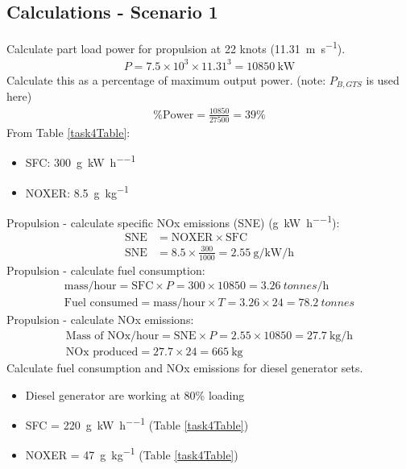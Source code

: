 \subsection{Calculations - Scenario 1}
Calculate part load power for propulsion at 22 knots (\SI{11.31}{\meter\per\second}).
\begin{gather}
    P = 7.5 \times 10^3 \times 11.31^3 = \SI{10850}{\kilo\watt}
\end{gather}
Calculate this as a percentage of maximum output power. (note: $P_{B,GTS}$ is used here)
\begin{gather}
    \textrm{\% Power} = \frac{10850}{27500} = 39\%
\end{gather}
From Table \ref{task4Table}:
\begin{itemize}
    \item SFC: \SI{300}{\gram\per\kilo\watt\per\hour}
    \item NOXER: \SI{8.5}{\gram\per\kilo\gram}
\end{itemize}
Propulsion - calculate specific NOx emissions (SNE) (\si{\gram\per\kilo\watt\per\hour}):
\begin{align}
    \textrm{SNE} & = \textrm{NOXER} \times \textrm{SFC}                                   \\
    \textrm{SNE} & = 8.5\times \frac{300}{1000} = \SI{2.55}{\gram\per\kilo\watt\per\hour}
\end{align}
Propulsion - calculate fuel consumption:
\begin{gather}
    \textrm{mass/hour} = \textrm{SFC}\times P = 300 \times 10850 = \SI{3.26}{tonnes\per\hour}\\
    \textrm{Fuel consumed} = \textrm{mass/hour} \times T = 3.26 \times 24 = \SI{78.2}{tonnes}
\end{gather}
Propulsion - calculate NOx emissions:
\begin{gather}
    \textrm{Mass of NOx/hour} = \textrm{SNE}\times P = 2.55 \times 10850 = \SI{27.7}{\kilo\gram\per\hour}\\
    \textrm{NOx produced} = 27.7 \times 24 = \SI{665}{\kilo\gram}
\end{gather}
Calculate fuel consumption and NOx emissions for diesel generator sets.
\begin{itemize}
    \item Diesel generator are working at 80\% loading
    \item SFC = \SI{220}{\gram\per\kilo\watt\per\hour} (Table \ref{task4Table})
    \item NOXER = \SI{47}{\gram\per\kilo\gram} (Table \ref{task4Table})
\end{itemize}
